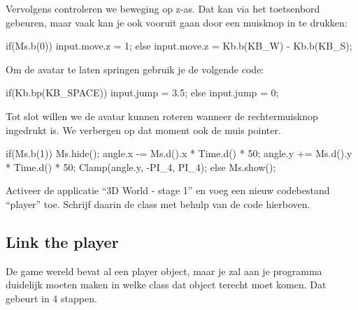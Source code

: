 Vervolgens controleren we beweging op z-as. Dat kan via het toetsenbord gebeuren, maar vaak kan je ook vooruit gaan door een muisknop in te drukken:

\begin{code}
if(Ms.b(0))
{
	 input.move.z = 1;
} else
{
	 input.move.z = Kb.b(KB_W) - Kb.b(KB_S);
}
\end{code}

Om de avatar te laten springen gebruik je de volgende code:

\begin{code}
if(Kb.bp(KB_SPACE))
{
	input.jump = 3.5;
} 
else
{
	input.jump = 0;
}
\end{code}

Tot slot willen we de avatar kunnen roteren wanneer de rechtermuisknop ingedrukt is. We verbergen op dat moment ook de muis pointer.

\begin{code}
if(Ms.b(1)) {
	 Ms.hide();
	 angle.x -= Ms.d().x * Time.d() * 50;
	 angle.y += Ms.d().y * Time.d() * 50;
	 Clamp(angle.y, -PI_4, PI_4);
} else
{
	 Ms.show();
}
\end{code}

\begin{exercise}
Activeer de applicatie ``3D World - stage 1'' en voeg een nieuw codebestand ``player'' toe. Schrijf daarin de class  met behulp van de code hierboven.
\end{exercise}

\subsection{Link the player}
De game wereld bevat al een player object, maar je zal aan je programma duidelijk moeten maken in welke class dat object terecht moet komen. Dat gebeurt in 4 stappen.

